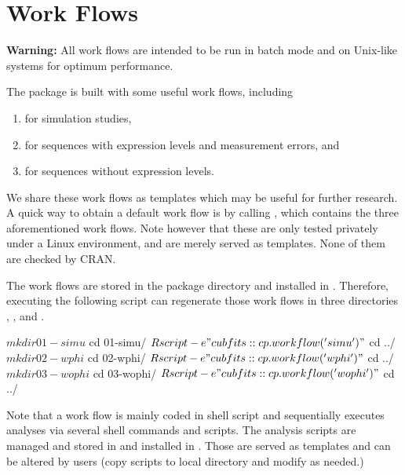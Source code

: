 
\section[Work Flows]{Work Flows}
\label{sec:work_flows}

{\color{red} \bf Warning:}
All work flows are intended to be run in batch mode and on Unix-like systems 
for optimum performance.

The  package is built with some useful work flows,
including
\begin{enumerate}
\item {} for simulation studies,
\item {} for sequences with expression levels and measurement errors,
      and
\item {} for sequences without expression levels.
\end{enumerate}
We share these work flows as templates which may be useful for further
research. A quick way to obtain a default work flow is by calling
, which contains the three aforementioned 
work flows. Note however that these are only tested privately under a 
Linux environment, and are merely served as templates. None of them are 
checked by CRAN.

The work flows are stored in the package directory
 and installed in
. Therefore, executing the
following script can regenerate those work flows in three directories
, , and .
\begin{Command}
$ mkdir 01-simu
$ cd 01-simu/
$ Rscript -e "cubfits::cp.workflow('simu')"
$ cd ../
$ mkdir 02-wphi
$ cd 02-wphi/
$ Rscript -e "cubfits::cp.workflow('wphi')"
$ cd ../
$ mkdir 03-wophi
$ cd 03-wophi/
$ Rscript -e "cubfits::cp.workflow('wophi')"
$ cd ../
\end{Command}
Note that a work flow is mainly coded in shell script and sequentially
executes analyses via several shell commands and  scripts. The
analysis  scripts are managed and stored in
 and installed in
. Those are served as
templates and can be altered by users (copy scripts to local directory
and modify as needed.)

